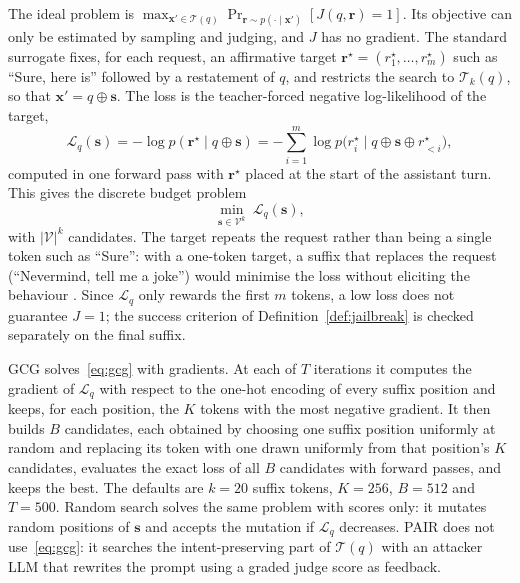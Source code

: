 \documentclass[10pt,a4paper]{extarticle}
\theoremstyle{definition}
\newcommand{\xadv}{\mathbf{x}'}
\newcommand{\T}{\mathcal{T}}
\begin{document}
The ideal problem is $\max_{\xadv\in\T(q)}\Pr_{\mathbf{r}\sim p(\cdot\mid\xadv)}[J(q,\mathbf{r})=1]$. Its objective can only be estimated by sampling and judging, and $J$ has no gradient. The standard surrogate fixes, for each request, an affirmative target $\mathbf{r}^\star=(r^\star_1,\dots,r^\star_m)$ such as ``Sure, here is'' followed by a restatement of $q$, and restricts the search to $\T_k(q)$, so that $\xadv=q\oplus\mathbf{s}$. The loss is the teacher-forced negative log-likelihood of the target,
\begin{equation}\label{eq:loss}
\mathcal{L}_q(\mathbf{s})=-\log p(\mathbf{r}^\star\mid q\oplus\mathbf{s})=-\sum_{i=1}^{m}\log p\big(r^\star_i\mid q\oplus\mathbf{s}\oplus r^\star_{<i}\big),
\end{equation}
computed in one forward pass with $\mathbf{r}^\star$ placed at the start of the assistant turn. This gives the discrete budget problem
\begin{equation}\label{eq:gcg}
\min_{\mathbf{s}\in\mathcal{V}^k}\ \mathcal{L}_q(\mathbf{s}),
\end{equation}
with $|\mathcal{V}|^k$ candidates. The target repeats the request rather than being a single token such as ``Sure'': with a one-token target, a suffix that replaces the request (``Nevermind, tell me a joke'') would minimise the loss without eliciting the behaviour \citep{zou2023universal}. Since $\mathcal{L}_q$ only rewards the first $m$ tokens, a low loss does not guarantee $J=1$; the success criterion of Definition~\ref{def:jailbreak} is checked separately on the final suffix.

GCG \citep{zou2023universal} solves~\eqref{eq:gcg} with gradients. At each of $T$ iterations it computes the gradient of $\mathcal{L}_q$ with respect to the one-hot encoding of every suffix position and keeps, for each position, the $K$ tokens with the most negative gradient. It then builds $B$ candidates, each obtained by choosing one suffix position uniformly at random and replacing its token with one drawn uniformly from that position's $K$ candidates, evaluates the exact loss of all $B$ candidates with forward passes, and keeps the best. The defaults are $k=20$ suffix tokens, $K=256$, $B=512$ and $T=500$. Random search \citep{andriushchenko2024simple} solves the same problem with scores only: it mutates random positions of $\mathbf{s}$ and accepts the mutation if $\mathcal{L}_q$ decreases. PAIR \citep{chao2023jailbreaking} does not use~\eqref{eq:gcg}: it searches the intent-preserving part of $\T(q)$ with an attacker LLM that rewrites the prompt using a graded judge score as feedback.
\end{document}
